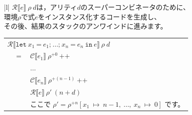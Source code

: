 \documentclass{jbook}
\begin{document}
\begin{tabular} {|l|} \hline
	$\mathcal{R} \llbracket e \rrbracket ~ \rho ~ d$は，アリティ$d$のスーパーコンビネータのために、               \\
	環境$\rho$で式$e$をインスタンス化するコードを生成し、                                                         \\
	その後、結果のスタックのアンワインドに進みます。                                                              \\
	\begin{tabular}{r c l}
		\multicolumn{3}{l}{$\mathcal{R} \llbracket \texttt{let} ~ x_1 ~ \texttt{=} ~ e_1\texttt{;} ~  \ldots \texttt{;} ~ x_n ~ \texttt{=} ~ e_n ~ \texttt{in} ~ e \rrbracket ~ \rho ~ d$}                                                                                                                           \\
		                                                                                      & $=$ & $\mathcal{C} \llbracket e_1 \rrbracket ~ \rho^{+0} ~ \texttt{++}$                                                                                                                                              \\
		                                                                                      &     & $\ldots$                                                                                                                                                                                                       \\
		                                                                                      &     & $\mathcal{C} \llbracket e_n \rrbracket ~ \rho^{+(n - 1)} ~ \texttt{++}$                                                                                                                                        \\
		                                                                                      &     & $\mathcal{R} \llbracket e \rrbracket ~ \rho' ~ (n + d)$                                                                                                                                                        \\
		                                                                                      &     & ここで $\rho' = \rho^{+n} \left[x_1 ~ \mapsto ~ n - 1, ~ \ldots , ~ x_n ~ \mapsto ~ 0\right]$ です。                                                                                                           \\

\end{tabular}
\end{tabular}
\end{document}
